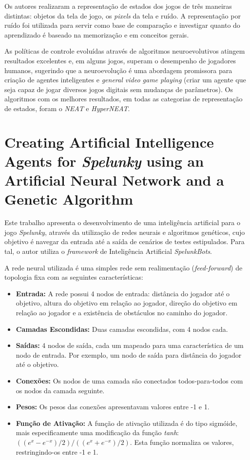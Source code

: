Os autores realizaram a representação de estados dos jogos de três maneiras
distintas: objetos da tela de jogo, os \textit{pixels} da tela e ruído.  A
representação por ruído foi utilizada para servir como base de comparação e
investigar quanto do aprendizado é baseado na memorização e em conceitos gerais.

As políticas de controle evoluídas através de algoritmos neuroevolutivos atingem
resultados excelentes e, em alguns jogos, superam o desempenho de jogadores
humanos, sugerindo que a neuroevolução é uma abordagem promissora para criação
de agentes inteligentes e \textit{general video game playing} (criar um agente
que seja capaz de jogar diversos jogos digitais sem mudanças de parâmetros). Os
algoritmos com os melhores resultados, em todas as categorias de representação
de estados, foram o \textit{NEAT} e \textit{HyperNEAT}.


\section{Creating Artificial Intelligence Agents for \textit{Spelunky} using an
Artificial Neural Network and a Genetic Algorithm}
Este trabalho \cite{spelunky_ann_genetic} apresenta o desenvolvimento de uma
inteligência artificial para o jogo \textit{Spelunky}, através da utilização de
redes neurais e algoritmos genéticos, cujo objetivo é navegar da entrada até a
saída de cenários de testes estipulados. Para tal, o autor utiliza o
\textit{framework} de Inteligência Artificial \textit{SpelunkBots}.

A rede neural utilizada é uma simples rede sem realimentação
(\textit{feed-forward}) de topologia fixa com as seguintes características:

\begin{itemize}
	\item \textbf{Entrada:} A rede possui 4 nodos de entrada: distância do
		jogador até o objetivo, altura do objetivo em relação ao jogador,
		direção do objetivo em relação ao jogador e a existência de obstáculos
		no caminho do jogador.
	
	\item \textbf{Camadas Escondidas:} Duas camadas escondidas, com 4 nodos
		cada.

	\item \textbf{Saídas:} 4 nodos de saída, cada um mapeado para uma
		característica de um nodo de entrada. Por exemplo, um nodo de saída para
		distância do jogador até o objetivo.

	\item \textbf{Conexões:} Os nodos de uma camada são conectados
		todos-para-todos com os nodos da camada seguinte.

	\item \textbf{Pesos:} Os pesos das conexões apresentavam valores entre -1 e
		1.

	\item \textbf{Função de Ativação:} A função de ativação utilizada é do tipo
		sigmóide, mais especificamente uma modificação da função \textit{tanh}:
		$((e^{x} - e^{-x})/2) / ((e^{x} + e^{-x})/2)$. Esta função normaliza os
		valores, restringindo-os entre -1 e 1.
\end{itemize}

